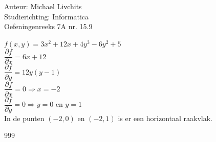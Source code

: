 \documentclass[a4paper]{article}
\begin{document}
  
\noindent \large Auteur: Michael Livchits \\
\noindent \large Studierichting: Informatica\\
\noindent \large Oefeningenreeks 7A nr. 15.9\\

\medskip

\normalsize

$f(x,y) = 3x^2+12x+4y^3-6y^2+5$\\

$\dfrac{\partial f}{\partial x} = 6x+12$\\

$\dfrac{\partial f}{\partial y} = 12y(y-1)$\\

$\dfrac{\partial f}{\partial x} = 0 \Rightarrow x = -2$\\

$\dfrac{\partial f}{\partial y} = 0\Rightarrow y = 0$ en $y = 1$\\

In de punten $(-2,0)$ en $(-2,1)$ is er een horizontaal raakvlak.\\

\begin{thebibliography}{999}
\end{thebibliography}
\end{document}
